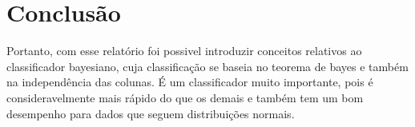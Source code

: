 \documentclass{article}
\begin{document}
\section{Conclusão}

Portanto, com esse relatório foi possivel introduzir conceitos relativos ao classificador bayesiano, cuja classificação se baseia no teorema de bayes e também na independência das colunas. É um classificador muito importante, pois é consideravelmente mais rápido do que os demais e também tem um bom desempenho para dados que seguem distribuições normais.
\end{document}
